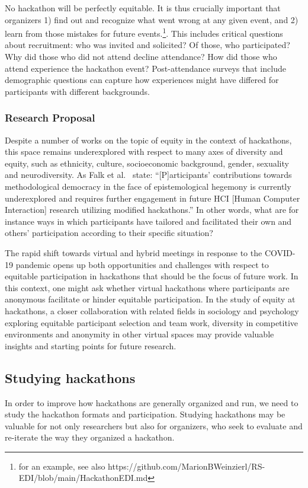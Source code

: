 \documentclass{ieeeaccess}
\begin{document}
No hackathon will be perfectly equitable. 
It is thus crucially important that organizers 1) find out and recognize what went wrong at any given event, and 2) learn from those mistakes for future events.\footnote{for an example, see also https://github.com/MarionBWeinzierl/RS-EDI/blob/main/HackathonEDI.md}. 
This includes critical questions about recruitment: who was invited and solicited? Of those, who participated? Why did those who did not attend decline attendance? How did those who attend experience the hackathon event? 
Post-attendance surveys that include demographic questions can capture how experiences might have differed for participants with different backgrounds. 

\subsubsection{Research Proposal}
Despite a number of works on the topic of equity in the context of hackathons, this space remains underexplored with respect to many axes of diversity and equity, such as ethnicity, culture, socioeconomic background, gender, sexuality and neurodiversity.
As Falk et al.~\cite{falk2021hackathons} state: 
``[P]articipants’ contributions towards methodological democracy in the face of epistemological hegemony is currently underexplored and requires further engagement in future HCI [Human Computer Interaction] research utilizing modified hackathons.''
In other words, what are for instance ways in which participants have tailored and facilitated their own and others' participation according to their specific situation?

The rapid shift towards virtual and hybrid meetings in response to the COVID-19 pandemic opens up both opportunities and challenges with respect to equitable participation in hackathons that should be the focus of future work. 
In this context, one might ask whether virtual hackathons where participants are anonymous facilitate or hinder equitable participation. 
In the study of equity at hackathons, a closer collaboration with related fields in sociology and psychology exploring equitable participant selection and team work, diversity in competitive environments and anonymity in other virtual spaces may provide valuable insights and starting points for future research. 

\subsection{Studying hackathons}
In order to improve how hackathons are generally organized and run, we need to study the hackathon formats and participation. 
Studying hackathons may be valuable for not only researchers but also for organizers, who seek to evaluate and re-iterate the way they organized a hackathon.
\end{document}
